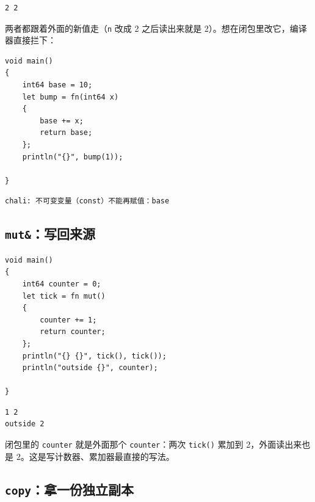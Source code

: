 \par
\medskip
\begin{lstlisting}[style=out]
2 2
\end{lstlisting}
\par
\medskip

两者都跟着外面的新值走（\texttt{n} 改成 2 之后读出来就是 2）。想在闭包里改它，编译器直接拦下：

\par
\medskip
\begin{lstlisting}[style=chali]
void main()
{
    int64 base = 10;
    let bump = fn(int64 x)
    {
        base += x;
        return base;
    };
    println("{}", bump(1));

}
\end{lstlisting}
\par
\medskip

\par
\medskip
\begin{lstlisting}[style=out]
chali: 不可变变量（const）不能再赋值：base
\end{lstlisting}
\par
\medskip

\subsection{\texttt{mut\&}：写回来源}

\par
\medskip
\begin{lstlisting}[style=chali]
void main()
{
    int64 counter = 0;
    let tick = fn mut()
    {
        counter += 1;
        return counter;
    };
    println("{} {}", tick(), tick());
    println("outside {}", counter);

}
\end{lstlisting}
\par
\medskip

\par
\medskip
\begin{lstlisting}[style=out]
1 2
outside 2
\end{lstlisting}
\par
\medskip

闭包里的 \texttt{counter} 就是外面那个 \texttt{counter}：两次 \texttt{tick(\allowbreak{})\allowbreak{}} 累加到 2，外面读出来也是 2。这是写计数器、累加器最直接的写法。

\subsection{\texttt{copy}：拿一份独立副本}

